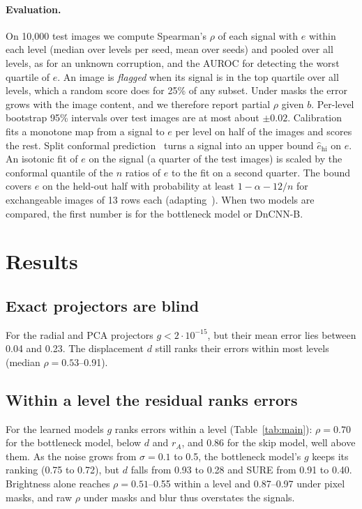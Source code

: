 \documentclass[10pt,twocolumn,a4paper]{article}
\begin{document}
\paragraph{Evaluation.}
On 10{,}000 test images we compute Spearman's $\rho$ of each signal with $e$ within each level
(median over levels per seed, mean over seeds) and pooled over all levels, as for an
unknown corruption, and the AUROC for detecting the worst quartile of $e$. An image is
\emph{flagged} when its signal is in the top quartile over all levels, which a random score does
for 25\% of any subset. Under masks the error grows with the image content, and we
therefore report partial $\rho$ given $b$. Per-level bootstrap 95\% intervals over test images are
at most about $\pm 0.02$. Calibration fits a monotone map from a signal to $e$ per level on
half of the images and scores the rest. Split conformal prediction~\cite{angelopoulos2021gentle}
turns a signal into an upper bound $\hat e_{\mathrm{hi}}$ on $e$. An isotonic fit of $e$ on the
signal (a quarter of the test images) is scaled by the conformal quantile of the $n$ ratios of $e$
to the fit on a second quarter. The bound covers $e$ on the held-out half with probability at least
$1-\alpha-12/n$ for exchangeable images of 13 rows each (adapting~\cite{angelopoulos2021gentle}).
When two models are compared, the first number is for the bottleneck model or DnCNN-B.

\section{Results}


\subsection{Exact projectors are blind}
For the radial and PCA projectors $g < 2\cdot10^{-15}$, but their mean error lies between 0.04
and 0.23. The displacement $d$ still ranks their errors within most
levels (median $\rho = 0.53$--0.91).

\subsection{Within a level the residual ranks errors}
For the learned models $g$ ranks errors within a level (Table~\ref{tab:main}): $\rho = 0.70$ for
the bottleneck model, below $d$ and $r_A$, and 0.86 for the skip model, well above them. As the
noise grows from $\sigma = 0.1$ to 0.5, the bottleneck model's $g$ keeps its ranking (0.75 to 0.72),
but $d$ falls from 0.93 to 0.28 and SURE from 0.91 to 0.40. Brightness alone reaches $\rho = 0.51$--0.55
within a level and 0.87--0.97 under pixel masks, and raw $\rho$ under masks and blur thus
overstates the signals.
\end{document}
